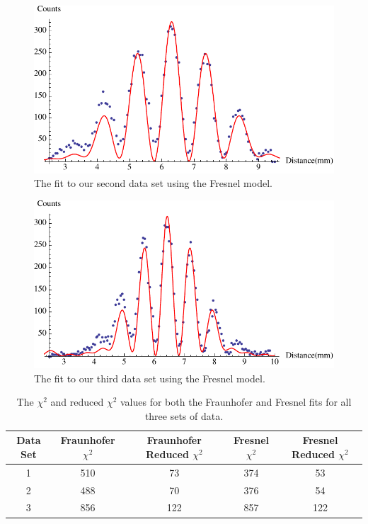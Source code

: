 \documentclass[prb,preprint]{revtex4-1}
\begin{document}
\begin{figure}[h!]
\centering
\includegraphics[width=6in]{doublefresnel2.pdf}
\caption{The fit to our second data set using the Fresnel model.}
\label{doublefresnel2}
\end{figure}

\begin{figure}[h!]
\centering
\includegraphics[width=6in]{doublefresnel3.pdf}
\caption{The fit to our third data set using the Fresnel model.}
\label{doublefresnel3}
\end{figure}


\begin{table}[h!]
\centering
\caption{The $\chi^2$ and reduced $\chi^2$ values for both the Fraunhofer and Fresnel fits for all three sets of data.}
\begin{ruledtabular}
\begin{tabular}{c c c c c}
Data Set & Fraunhofer $\chi^2$ & Fraunhofer Reduced $\chi^2$ & Fresnel $\chi^2$ & Fresnel Reduced $\chi^2$ \\
\hline	
1 & 510 &   73 & 374 &  53  \\
2 & 488 &   70 & 376 &  54  \\
3 & 856 & 122 & 857 & 122  \\

\end{tabular}
\end{ruledtabular}
\label{chisquared}
\end{table}
\end{document}
